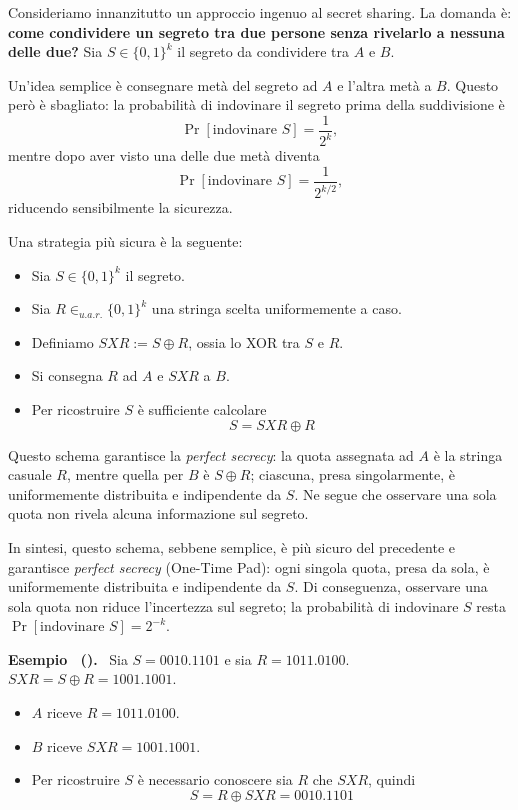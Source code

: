 \documentclass[a4paper, 11pt]{article}
\newenvironment{example}[1][]{
  \par\noindent\textbf{Esempio%
  \if\relax\detokenize{#1}\relax\else\ (\textbf{#1})\fi.}\ }{}
\begin{document}
Consideriamo innanzitutto un approccio ingenuo al secret sharing. La domanda è: \textbf{come condividere un segreto tra due persone senza rivelarlo a nessuna delle due?}
Sia $S \in \{0, 1\}^k$ il segreto da condividere tra $A$ e $B$.

Un'idea semplice è consegnare metà del segreto ad $A$ e l'altra metà a $B$. Questo però è sbagliato: la probabilità di indovinare il segreto prima della suddivisione è
\[
\Pr[\text{indovinare } S] = \frac{1}{2^k},
\]
mentre dopo aver visto una delle due metà diventa
\[
\Pr[\text{indovinare } S] = \frac{1}{2^{k/2}},
\]
riducendo sensibilmente la sicurezza.

Una strategia più sicura è la seguente:
\begin{itemize}
    \item Sia $S \in \{0,1\}^k$ il segreto.
    \item Sia $R \in_{u.a.r.} \{0,1\}^k$ una stringa scelta uniformemente a caso.
    \item Definiamo $SXR := S \oplus R$, ossia lo XOR tra $S$ e $R$.
    \item Si consegna $R$ ad $A$ e $SXR$ a $B$.
    \item Per ricostruire $S$ è sufficiente calcolare
    \[
    S = SXR \oplus R
    \]
\end{itemize}

Questo schema garantisce la \textit{perfect secrecy}: la quota assegnata ad $A$ è la stringa casuale $R$, mentre quella per $B$ è $S \oplus R$; ciascuna, presa singolarmente, è uniformemente distribuita e indipendente da $S$. Ne segue che osservare una sola quota non rivela alcuna informazione sul segreto.

In sintesi, questo schema, sebbene semplice, è più sicuro del precedente e garantisce \textit{perfect secrecy} (One-Time Pad): ogni singola quota, presa da sola, è uniformemente distribuita e indipendente da $S$. Di conseguenza, osservare una sola quota non riduce l'incertezza sul segreto; la probabilità di indovinare $S$ resta $\Pr[\text{indovinare } S]=2^{-k}$.

\begin{example}
    Sia $S = 0010.1101$ e sia $R = 1011.0100$. $SXR = S \oplus R = 1001.1001$.
    \begin{itemize}
        \item $A$ riceve $R = 1011.0100$.
        \item $B$ riceve $SXR = 1001.1001$.
        \item Per ricostruire $S$ è necessario conoscere sia $R$ che $SXR$, quindi 
        \[S = R \oplus SXR = 0010.1101\]
    \end{itemize}    
\end{example}
\end{document}
